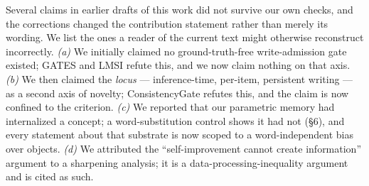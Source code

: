 \documentclass[11pt]{article}
\begin{document}
Several claims in earlier drafts of this work did not survive our own checks, and the
corrections changed the contribution statement rather than merely its wording. We list the
ones a reader of the current text might otherwise reconstruct incorrectly.
\emph{(a)} We initially claimed no ground-truth-free write-admission gate existed; GATES and
LMSI refute this, and we now claim nothing on that axis.
\emph{(b)} We then claimed the \emph{locus} --- inference-time, per-item, persistent writing
--- as a second axis of novelty; ConsistencyGate refutes this, and the claim is now confined
to the criterion.
\emph{(c)} We reported that our parametric memory had internalized a concept; a
word-substitution control shows it had not (\S6), and every statement about that substrate
is now scoped to a word-independent bias over objects.
\emph{(d)} We attributed the ``self-improvement cannot create information'' argument to a
sharpening analysis; it is a data-processing-inequality argument and is cited as such.




\end{document}

